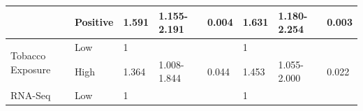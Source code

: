 \documentclass[jpm,article,submit,moreauthors,pdftex]{Definitions/mdpi}
\begin{document}
\begin{table}[!hp]
{\begin{tabular}{|l|l|l|l|l|l|l|l|}
\cline{2-8}
                                        & Positive                                                                            & 1.591                                                                          & 1.155-2.191                                                                   & \textcolor[rgb]{1,0.149,0}{0.004}                                             & 1.631                                                                          & 1.180-2.254                                                                   & \textcolor[rgb]{1,0.149,0}{0.003}                                              \\ 
\hline
\multirow{2}{*}{Tobacco Exposure}       & {\cellcolor[rgb]{0.62,0.812,0.878}}Low                                              & {\cellcolor[rgb]{0.62,0.812,0.878}}1                                           & {\cellcolor[rgb]{0.62,0.812,0.878}}                                           & {\cellcolor[rgb]{0.62,0.812,0.878}}                                           & {\cellcolor[rgb]{0.62,0.812,0.878}}1                                           & {\cellcolor[rgb]{0.62,0.812,0.878}}                                           & {\cellcolor[rgb]{0.62,0.812,0.878}}                                            \\ 
\cline{2-8}
                                        & High                                                                                & 1.364                                                                          & 1.008-1.844                                                                   & \textcolor[rgb]{1,0.149,0}{0.044}                                             & 1.453                                                                          & 1.055-2.000                                                                   & \textcolor[rgb]{1,0.149,0}{0.022}                                              \\ 
\hline
\multirow{2}{*}{RNA-Seq}                & {\cellcolor[rgb]{0.62,0.812,0.878}}Low                                              & {\cellcolor[rgb]{0.62,0.812,0.878}}1                                           & {\cellcolor[rgb]{0.62,0.812,0.878}}                                           & {\cellcolor[rgb]{0.62,0.812,0.878}}                                           & {\cellcolor[rgb]{0.62,0.812,0.878}}1                                           & {\cellcolor[rgb]{0.62,0.812,0.878}}                                           & {\cellcolor[rgb]{0.62,0.812,0.878}}                                            \\ 

\end{tabular}}
\end{table}
\end{document}
